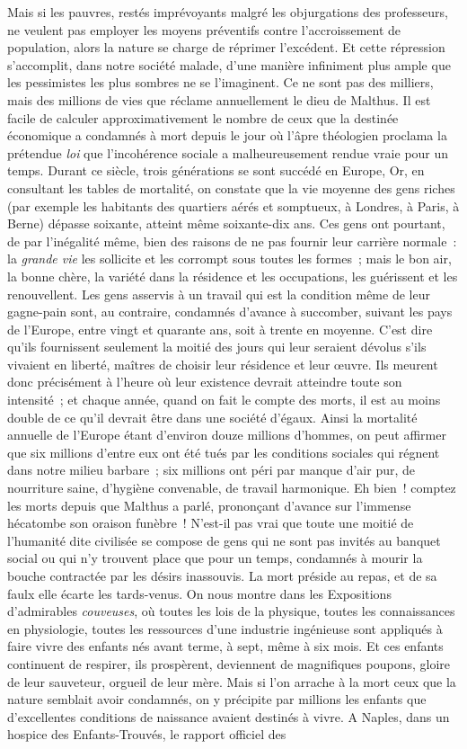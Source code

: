 \documentclass[french,twoside]{book} %
\begin{document}
Mais si les pauvres, restés imprévoyants malgré les objurgations des professeurs, ne veulent pas employer les moyens préventifs contre l’accroissement de population, alors la nature se charge de réprimer l’excédent. Et cette répression s’accomplit, dans notre société malade, d’une manière infiniment plus ample que les pessimistes les plus sombres ne se l’imaginent. Ce ne sont  pas des milliers, mais des millions de vies que réclame annuellement le dieu de Malthus. Il est facile de calculer approximativement le nombre de ceux que la destinée économique a condamnés à mort depuis le jour où l’âpre théologien proclama la prétendue \emph{loi} que l’incohérence sociale a malheureusement rendue vraie pour un temps. Durant ce siècle, trois générations se sont succédé en Europe, Or, en consultant les tables de mortalité, on constate que la vie moyenne des gens riches (par exemple les habitants des quartiers aérés et somptueux, à Londres, à Paris, à Berne) dépasse soixante, atteint même soixante-dix ans. Ces gens ont pourtant, de par l’inégalité même, bien des raisons de ne pas fournir leur carrière normale :  la \emph{grande vie} les sollicite et les corrompt sous toutes les formes ; mais le bon air, la bonne chère, la variété dans la résidence et les occupations, les guérissent et les renouvellent. Les gens asservis à un travail qui est la condition même de leur gagne-pain sont, au contraire, condamnés d’avance à succomber, suivant les pays de l’Europe, entre vingt et quarante ans, soit à trente en moyenne. C’est dire qu’ils fournissent seulement la moitié des jours qui leur seraient dévolus s’ils vivaient en liberté, maîtres de choisir leur résidence et leur œuvre. Ils meurent donc précisément à l’heure où leur existence devrait atteindre toute son intensité ; et chaque année, quand on fait le compte des morts, il est au moins double de ce qu’il devrait être  dans une société d’égaux. Ainsi la mortalité annuelle de l’Europe étant d’environ douze millions d’hommes, on peut affirmer que six millions d’entre eux ont été tués par les conditions sociales qui régnent dans notre milieu barbare ; six millions ont péri par manque d’air pur, de nourriture saine, d’hygiène convenable, de travail harmonique. Eh bien ! comptez les morts depuis que Malthus a parlé, prononçant d’avance sur l’immense hécatombe son oraison funèbre ! N’est-il pas vrai que toute une moitié de l’humanité dite civilisée se compose de gens qui ne sont pas invités au banquet social ou qui n’y trouvent place que pour un temps, condamnés à mourir la bouche contractée par les désirs inassouvis. La mort préside au repas, et de sa faulx elle  écarte les tards-venus. On nous montre dans les Expositions d’admirables \emph{couveuses}, où toutes les lois de la physique, toutes les connaissances en physiologie, toutes les ressources d’une industrie ingénieuse sont appliqués à faire vivre des enfants nés avant terme, à sept, même à six mois. Et ces enfants continuent de respirer, ils prospèrent, deviennent de magnifiques poupons, gloire de leur sauveteur, orgueil de leur mère. Mais si l’on arrache à la mort ceux que la nature semblait avoir condamnés, on y précipite par millions les enfants que d’excellentes conditions de naissance avaient destinés à vivre. A Naples, dans un hospice des Enfants-Trouvés, le rapport officiel des 
\end{document}
